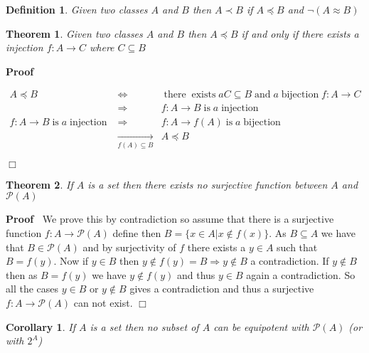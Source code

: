 \documentclass{book}
\newcommand{\Rightarrowlim}{\mathop{\rightarrow}\limits}
\newcommand{\nin}{\not\in}
\newcommand{\tmop}[1]{\ensuremath{\operatorname{#1}}}
\newenvironment{proof}{\noindent\textbf{Proof\ }}{\hspace*{\fill}$\Box$\medskip}
\newtheorem{corollary}{Corollary}
\newtheorem{definition}{Definition}
{\theorembodyfont{\rmfamily}\newtheorem{example}{Example}}
\newtheorem{theorem}{Theorem}
\begin{document}
{{\begin{definition}
  Given two classes $A$ and $B$ then $A \prec B$ if $A \preccurlyeq B$ and
  $\neg (A \approx B)$
\end{definition}

\begin{theorem}
  \label{AB and injection}Given two classes $A$ and $B$ then $A \preccurlyeq
  B$ if and only if there exists a injection $f : A \rightarrow C$ where $C
  \subseteq B$
\end{theorem}

\begin{proof}
  
  \begin{eqnarray*}
    A \preccurlyeq B & \Leftrightarrow & \tmop{there} \tmop{exists} a C
    \subseteq B \tmop{and} a \tmop{bijection} f : A \rightarrow C\\
    & \Rightarrow & f : A \rightarrow B \tmop{is} a \tmop{injection}\\
    f : A \rightarrow B \tmop{is} a \tmop{injection} & \Rightarrow & f : A
    \rightarrow f (A) \tmop{is} a \tmop{bijection}\\
    & \Rightarrowlim_{f (A) \subseteq B} & A \preccurlyeq B
  \end{eqnarray*}
  
\end{proof}

\begin{theorem}
  \label{there is no surjection between A and P(A)}If $A$ is a set then there
  exists no surjective function between $A$ and $\mathcal{P} (A)$
\end{theorem}

\begin{proof}
  We prove this by contradiction so assume that there is a surjective function
  $f : A \rightarrow \mathcal{P} (A)$ define then $B = \{ x \in A|x \nin f (x)
  \}$. As $B \subseteq A$ we have that $B \in \mathcal{P} (A)$ and by
  surjectivity of $f$ there exists a $y \in A$ such that $B = f (y)$. Now if
  $y \in B$ then $y \nin f (y) = B \Rightarrow y \nin B$ a contradiction. If
  $y \nin B$ then as $B = f (y)$ we have $y \nin f (y)$ and thus $y \in B$
  again a contradiction. So all the cases $y \in B$ or $y \nin B$ gives a
  contradiction and thus a surjective $f : A \rightarrow \mathcal{P} (A)$ can
  not exist.
\end{proof}

\begin{corollary}
  If $A$ is a set then no subset of $A$ can be equipotent with $\mathcal{P}
  (A)$ (or with $2^A$)
\end{corollary}

}}
\end{document}
